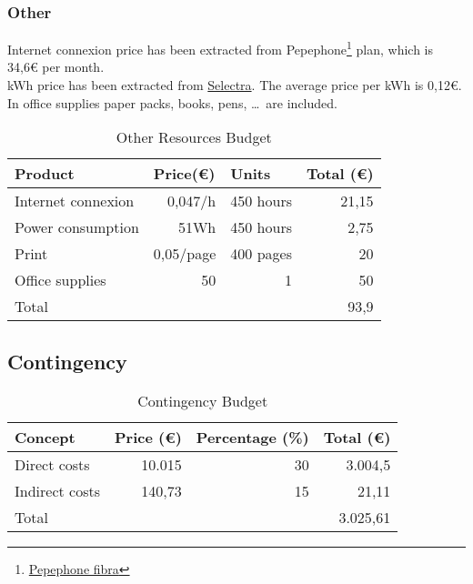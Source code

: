 \subsubsection{Other}
Internet connexion price has been extracted from Pepephone\footnote{\href{https://www.pepephone.com/internet-en-casa}{Pepephone fibra}} plan, which is 34,6€ per month. \\
kWh price has been extracted from \href{https://tarifasgasluz.com/faq/precio-kwh-espana-2017}{Selectra}. The average price per kWh is 0,12€.
In office supplies paper packs, books, pens, \ldots \ are included.
\begin{table}[h!]
	\centering
	\begin{tabular}{|l|r|r|r|}
		\hline
		\multicolumn{1}{|l|}{Product} & \multicolumn{1}{l|}{Price(€)} & \multicolumn{1}{l|}{Units} & \multicolumn{1}{l|}{Total (€)} \\ \hline
		Internet connexion & 0,047/h & 450 hours & 21,15\\ \hline
		Power consumption & 51Wh & 450 hours & 2,75 \\ \hline
		Print & 0,05/page & 400 pages & 20 \\ \hline
		Office supplies & 50 & 1 & 50 \\ \hline\hline
		Total & \multicolumn{3}{r|}{93,9}                                                                        \\ \hline
	\end{tabular}
	\caption{Other Resources Budget}
	\label{OtherResources}
\end{table}

\subsection{Contingency}
\begin{table}[h!]
	\centering
	\begin{tabular}{|l|r|r|r|}
		\hline
		\multicolumn{1}{|l|}{Concept} & \multicolumn{1}{l|}{Price (€)} & \multicolumn{1}{l|}{Percentage (\%)} & \multicolumn{1}{l|}{Total (€)} \\ \hline
		Direct costs & 10.015 & 30 & 3.004,5 \\ \hline
		Indirect costs & 140,73 & 15 & 21,11\\ \hline\hline
		Total & \multicolumn{3}{r|}{3.025,61} \\ \hline
	\end{tabular}
	\caption{Contingency Budget}
	\label{Contingency}
\end{table}

